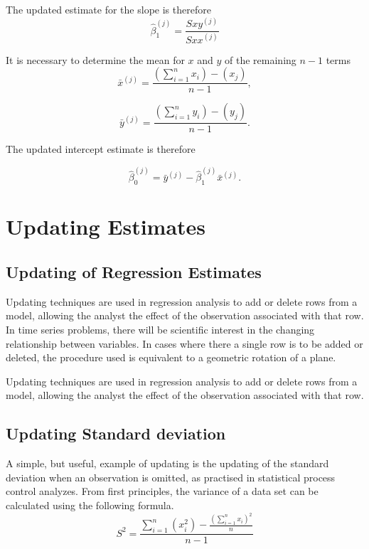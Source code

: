 \documentclass[12pt, a4paper]{report}
\theoremstyle{plain}
\theoremstyle{definition}
\theoremstyle{remark}
\begin{document}
The updated estimate for the slope is therefore
\begin{equation}
\hat{\beta}_{1}^{(j)}=\frac{Sxy^{(j)}}{Sxx^{(j)}}
\end{equation}


It is necessary to determine the mean for $x$ and $y$ of the
remaining $n-1$ terms
\begin{equation}
\bar{x}^{(j)}=\frac{(\sum_{i=1}^{n}x_{i})-(x_{j})}{n-1},
\end{equation}


\begin{equation}
\bar{y}^{(j)}=\frac{(\sum_{i=1}^{n}y_{i})-(y_{j})}{n-1}.
\end{equation}


The updated intercept estimate is therefore


\begin{equation}
\hat{\beta}_{0}^{(j)}=\bar{y}^{(j)}-\hat{\beta}_{1}^{(j)}\bar{x}^{(j)}.
\end{equation}


\newpage
\section{Updating Estimates} %


\subsection{Updating of Regression Estimates}
Updating techniques are used in regression analysis to add or delete rows from a model, allowing the analyst the effect of the observation associated with that row. In time series problems, there will be scientific interest in the changing relationship between variables. In cases where there a single row is to be added or deleted, the procedure used is equivalent to a geometric rotation of a plane.


Updating techniques are used in regression analysis to add or delete rows from a model, allowing the analyst the effect of the observation associated with that row.


\subsection{Updating Standard deviation}
A simple, but useful, example of updating is the updating of the standard deviation when an observation is omitted, as practised in statistical process control analyzes. From first principles, the variance of a data set can be calculated using the following formula.
\begin{equation}
S^{2}=\frac{\sum_{i=1}^{n}(x_{i}^{2})-\frac{(\sum_{i=1}^{n}x_{i})^{2}}{n}}{n-1}
\end{equation}
\end{document}
